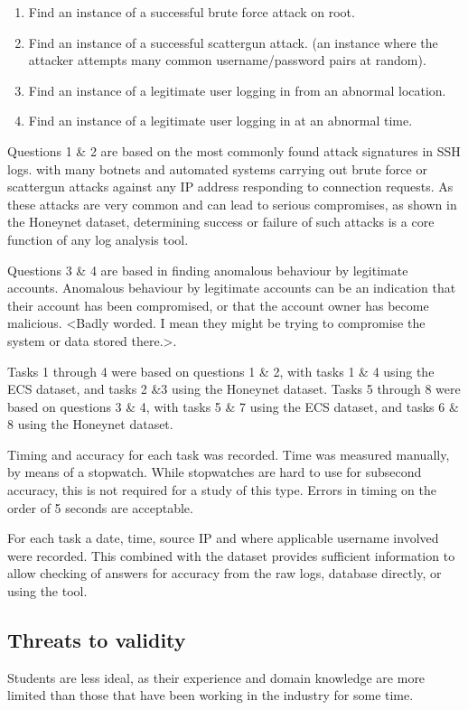 \begin{enumerate}
\item{Find an instance of a successful brute force attack on root.}
\item{Find an instance of a successful scattergun attack.
(an instance where the attacker attempts many common username/password pairs at random).}
\item{Find an instance of a legitimate user logging in from an abnormal location.}
\item{Find an instance of a legitimate user logging in at an abnormal time.}
\end{enumerate}

Questions 1 \& 2 are based on the most commonly found attack signatures in SSH logs. with many botnets and automated systems carrying out brute force or scattergun attacks against any IP address responding to connection requests. As these attacks are very common and can lead to serious compromises, as shown in the Honeynet dataset, determining success or failure of such attacks is a core function of any log analysis tool. 

Questions 3 \& 4 are based in finding anomalous behaviour by legitimate accounts. Anomalous behaviour by legitimate accounts can be an indication that their account has been compromised, or that the account owner has become malicious. <Badly worded. I mean they might be trying to compromise the system or data stored there.>. 

Tasks 1 through 4 were based on questions 1 \& 2, with tasks 1 \& 4 using the ECS dataset, and tasks 2 \&3 using the Honeynet dataset.
Tasks 5 through 8 were based on questions 3 \& 4, with tasks 5 \& 7 using the ECS dataset, and tasks 6 \& 8 using  the Honeynet dataset. 

Timing and accuracy for each task was recorded. 
Time was measured manually, by means of a stopwatch. While stopwatches are hard to use for subsecond accuracy, this is not required for a study of this type. Errors in timing on the order of 5 seconds are acceptable.

For each task a date, time, source IP and where applicable username involved were recorded. This combined with the dataset provides sufficient information to allow checking of answers for accuracy from the raw logs, database directly, or using the tool. 

\subsection{Threats to validity}
 Students are less ideal, as their experience and domain knowledge are more limited than those that have been working in the industry for some time.
 

